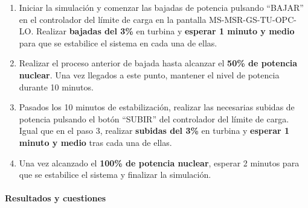 \begin{enumerate}
  \item Iniciar la simulación y comenzar las bajadas de potencia pulsando ``BAJAR'' en el controlador del límite de carga en la pantalla MS-MSR-GS-TU-OPC-LO. Realizar \textbf{bajadas del 3\%} en turbina y \textbf{esperar 1 minuto y medio} para que se estabilice el sistema en cada una de ellas. 
  \item Realizar el proceso anterior de bajada hasta alcanzar el \textbf{50\% de potencia nuclear}. Una vez llegados a este punto, mantener el nivel de potencia durante 10 minutos.
  \item Pasados los 10 minutos de estabilización, realizar las necesarias subidas de potencia pulsando el botón ``SUBIR'' del controlador del límite de carga. Igual que en el paso 3, realizar \textbf{subidas del 3\%} en turbina y \textbf{esperar 1 minuto y medio} tras cada una de ellas.
  \item Una vez alcanzado el \textbf{100\% de potencia nuclear}, esperar 2 minutos para que se estabilice el sistema y finalizar la simulación.
\end{enumerate}  

\paragraph{Resultados y cuestiones}


